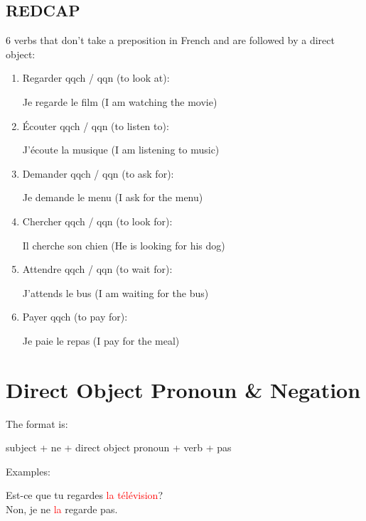 \documentclass{book}
\begin{document}
        \subsection{REDCAP}
            6 verbs that don't take a preposition in French and are followed by a direct object:
            \begin{enumerate}
                \item Regarder qqch / qqn (to look at):
                    \begin{center}
                        Je regarde le film (I am watching the movie)
                    \end{center}
                \item Écouter qqch / qqn (to listen to):
                    \begin{center}
                        J'écoute la musique (I am listening to music)
                    \end{center}
                \item Demander qqch / qqn (to ask for):
                    \begin{center}
                        Je demande le menu (I ask for the menu)
                    \end{center}
                \item Chercher qqch / qqn (to look for):
                    \begin{center}
                        Il cherche son chien (He is looking for his dog)
                    \end{center}
                \item Attendre qqch / qqn (to wait for):
                    \begin{center}
                        J'attends le bus (I am waiting for the bus)
                    \end{center}
                \item Payer qqch (to pay for):
                    \begin{center}
                        Je paie le repas (I pay for the meal)
                    \end{center}
            \end{enumerate}

    \section{Direct Object Pronoun \& Negation}
        The format is:
            \begin{center}
                subject + ne + direct object pronoun + verb + pas
            \end{center}
        Examples:
            \begin{center}
                Est-ce que tu regardes \textcolor{red}{la télévision}? \\
                Non, je ne \textcolor{red}{la} regarde pas. 
            \end{center}
\end{document}
